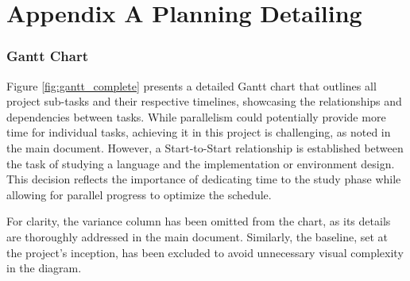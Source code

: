 
\chapter{Appendix A Planning Detailing} %

\label{AppendixA} %

\subsection{Gantt Chart}

Figure \ref{fig:gantt_complete} presents a detailed Gantt chart that outlines all project sub-tasks and their respective timelines, showcasing the relationships and dependencies between tasks. While parallelism could potentially provide more time for individual tasks, achieving it in this project is challenging, as noted in the main document. However, a Start-to-Start relationship is established between the task of studying a language and the implementation or environment design. This decision reflects the importance of dedicating time to the study phase while allowing for parallel progress to optimize the schedule.

For clarity, the variance column has been omitted from the chart, as its details are thoroughly addressed in the main document. Similarly, the baseline, set at the project’s inception, has been excluded to avoid unnecessary visual complexity in the diagram.


